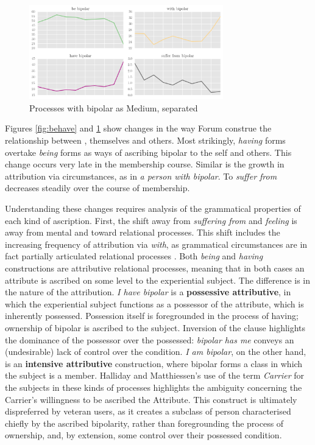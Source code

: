   \begin{figure}[htb]
  \begin{center}
  \includegraphics[width=0.75\textwidth]{../images/being_having_subplots.png}
  \end{center}
  \caption{Processes with bipolar as Medium, separated}
  \label{fig:behave_subplot}
  \end{figure}

Figures \ref{fig:behave} and \ref{fig:behave_subplot} show changes in the way \gls{Forum}  construe the relationship between , themselves and others. Most strikingly, \emph{having} forms overtake \emph{being} forms as ways of ascribing \gls{bipolar} to the self and others. This change occurs very late in the membership course. Similar is the growth in attribution via circumstances, as in \emph{a person with bipolar}. To \emph{suffer from}  decreases steadily over the course of membership.

Understanding these changes requires analysis of the grammatical properties of each kind of ascription. First, the shift away from \emph{suffering from} and \emph{feeling} is away from mental and toward relational processes. This shift includes the increasing frequency of attribution via \emph{with}, as grammatical circumstances are in fact partially articulated relational processes \cite{matthiessen_lexicogrammatical_1995}. Both \emph{being} and \emph{having} constructions are attributive relational processes, meaning that in both cases an attribute is ascribed on some level to the experiential subject. The difference is in the nature of the attribution. \emph{I have bipolar} is a \textbf{possessive attributive}, in which the experiential subject functions as a possessor of the attribute, which is inherently possessed. Possession itself is foregrounded in the process of having; ownership of bipolar is ascribed to the subject. Inversion of the clause highlights the dominance of the possessor over the possessed: \emph{bipolar has me} conveys an (undesirable) lack of control over the condition. \emph{I am bipolar}, on the other hand, is an \textbf{intensive attributive} construction, where bipolar forms a class in which the subject is a member. Halliday and Matthiessen's \parencite*{halliday_introduction_2004} use of the term \emph{Carrier} for the subjects in these kinds of processes highlights the ambiguity concerning the Carrier's willingness to be ascribed the Attribute. This construct is ultimately dispreferred by veteran users, as it creates a subclass of person characterised chiefly by the ascribed bipolarity, rather than foregrounding the process of ownership, and, by extension, some control over their possessed condition.

